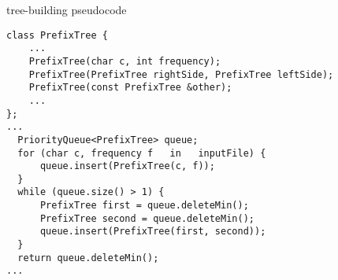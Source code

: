 \begin{frame}[fragile,label=treePsuedo]{tree-building pseudocode}
\lstset{language=C++,style=smaller}
\begin{lstlisting}
class PrefixTree { 
    ...
    PrefixTree(char c, int frequency);
    PrefixTree(PrefixTree rightSide, PrefixTree leftSide);
    PrefixTree(const PrefixTree &other);
    ...
};
...
  PriorityQueue<PrefixTree> queue;
  for (char c, frequency f   in   inputFile) {
      queue.insert(PrefixTree(c, f));
  }
  while (queue.size() > 1) {
      PrefixTree first = queue.deleteMin();
      PrefixTree second = queue.deleteMin();
      queue.insert(PrefixTree(first, second));
  }
  return queue.deleteMin();
...
\end{lstlisting}
\end{frame}

